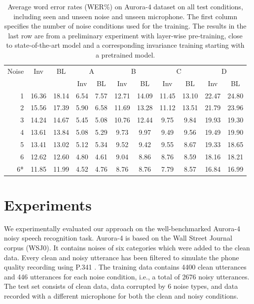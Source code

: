 \documentclass[a4paper]{article}
\begin{document}
\begin{table}[t]
    \centering
    \caption{Average word error rates (WER\%) on Aurora-4 dataset on all test conditions,
        including seen and unseen noise and unseen microphone. The first column
        specifies the number of noise conditions used for the training. The
        results in the last row are from a preliminary experiment with
        layer-wise pre-training, close to state-of-the-art
        model and a corresponding invariance training starting with a pretrained model.}
    \label{tab:results}
    \begin{tabular}{r|cc||cc|cc|cc|cc}
        Noise       &Inv&BL&  \multicolumn{2}{c|}{A} & \multicolumn{2}{c|}{B} & \multicolumn{2}{c|}{C} & \multicolumn{2}{c}{D}\\
               & & &  Inv & BL & Inv & BL & Inv & BL & Inv & BL\\
    \hline
    1           &16.36        &18.14 &6.54&7.57    &12.71& 14.09   & 11.45&   13.10    & 22.47 &   24.80    \\
    2           &15.56        &17.39 &5.90&  6.58 &   11.69   &13.28   &11.12   &13.51   &21.79   &23.96 \\
    3           &14.24        &14.67 &5.45 & 5.08&    10.76&   12.44&   9.75&    9.84 &   19.93&   19.30\\
    4           &13.61        &13.84 & 5.08 &5.29    &9.73    &9.97    &9.49    &9.56    &19.49   &19.90\\         
    5           &13.41        &13.02 & 5.12 &5.34    &9.52    &9.42    &9.55    &8.67    &19.33   &18.65\\         
    6           &12.62        &12.60 & 4.80 &4.61    &9.04    &8.86    &8.76    &8.59    &18.16   &18.21\\
    \hline\hline
    6* &11.85        &11.99    &4.52    &4.76    &8.76    &8.76    &7.79    &8.57    &16.84&    16.99
    \end{tabular}
\end{table}

\section{Experiments}
\label{sec:experiments}
We experimentally evaluated our approach   
on the well-benchmarked Aurora-4 \citep{parihar2002aurora} noisy speech recognition task. Aurora-4
is based on the Wall Street Journal corpus (WSJ0). It contains noises of 
six categories which were added to the clean data. Every clean and noisy
utterance has been 
filtered to simulate the phone quality recording using P.341 \citep{parihar2002aurora}. The training
data contains 4400 clean utterances and 446 utterances for each noise condition,
i.e., a total of 2676 noisy utterances.
The test set consists of clean data, data corrupted by 6 noise types, and data 
recorded with a different microphone for both the clean and noisy conditions.
\end{document}

